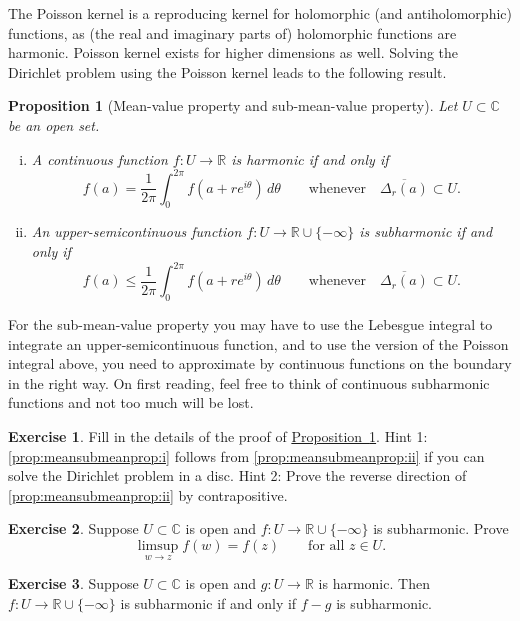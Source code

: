 \documentclass[12pt,openany]{book}
\newcommand{\C}{{\mathbb{C}}}
\newcommand{\R}{{\mathbb{R}}}
\theoremstyle{plain}
\newtheorem{prop}[thm]{Proposition}
\theoremstyle{remark}
\theoremstyle{definition}
\newenvironment{exbox}{%
    \def\FrameCommand{\vrule width 1pt \relax\hspace{10pt}}%
    \MakeFramed{\advance\hsize-\width\FrameRestore}%
}{%
    \endMakeFramed
}
\theoremstyle{exercise}
\newtheorem{exercise}{Exercise}[section]
\theoremstyle{example}
\newcommand{\propref}[1]{\hyperref[#1]{Proposition~\ref*{#1}}}
\begin{document}
The Poisson kernel is a reproducing kernel for
holomorphic (and antiholomorphic) functions, as (the real and imaginary parts of) holomorphic functions are harmonic.
Poisson kernel exists for higher dimensions as well.
Solving the Dirichlet problem using the Poisson kernel leads to
the following result.

\begin{prop}[Mean-value property and sub-mean-value property]
\pagebreak[2]%
\label{prop:meansubmeanprop}%
%
%
Let $U \subset \C$ be an open set.
\begin{enumerate}[(i)]
\item
\label{prop:meansubmeanprop:i}%
A continuous function
$f \colon U \to \R$
is harmonic if and only if
\begin{equation*}
f(a) = \frac{1}{2\pi} \int_0^{2\pi} f(a+re^{i\theta})\, d\theta
\qquad \text{whenever} \quad
\overline{\Delta_r(a)} \subset U .
\end{equation*}
\item
\label{prop:meansubmeanprop:ii}%
An upper-semicontinuous function $f \colon U \to \R \cup \{ -\infty \}$
is subharmonic if and only if
\begin{equation*}
f(a) \leq \frac{1}{2\pi} \int_0^{2\pi} f(a+re^{i\theta})\, d\theta
\qquad \text{whenever} \quad
\overline{\Delta_r(a)} \subset U .
\end{equation*}
\end{enumerate}
\end{prop}

For the sub-mean-value property you may have to use
the Lebesgue integral to integrate an upper-semicontinuous function,
and to use the version of the Poisson integral above, you need to
approximate by continuous functions on the boundary in the right way.
On first reading, feel free to think of continuous subharmonic
functions and not too much will be lost.

\begin{exbox}
\begin{exercise}
Fill in the details of the proof of \propref{prop:meansubmeanprop}.
Hint 1: \ref{prop:meansubmeanprop:i} follows from
\ref{prop:meansubmeanprop:ii} if you can solve
the Dirichlet problem in a disc.
Hint 2: Prove the reverse direction of \ref{prop:meansubmeanprop:ii}
by contrapositive.
\end{exercise}

\begin{exercise} \label{exercise:limsupsubharmonic}
Suppose $U \subset \C$ is open and
$f \colon U \to \R \cup\{- \infty \}$ is subharmonic.  Prove
\begin{equation*}
\limsup_{w \to z} f(w) = f(z)
\qquad \text{for all $z \in U$.}
\end{equation*}
\end{exercise}

\begin{exercise} \label{exercise:fminusgsubharmonic}
Suppose $U \subset \C$ is open and $g \colon U \to \R$ is harmonic.
Then $f \colon U \to \R \cup \{ -\infty \}$ is subharmonic if and only if $f-g$
is subharmonic.
\end{exercise}
\end{exbox}
\end{document}
